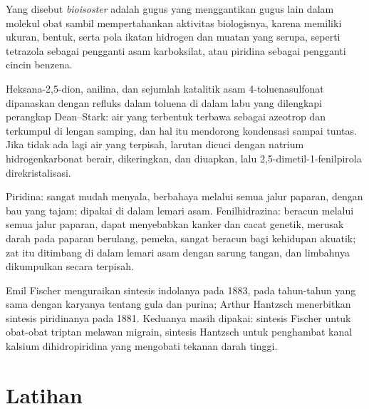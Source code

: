 \begin{definition}[Bioisoster]\label{def:b3:heterocycles:bioisostere}
Yang disebut \emph{bioisoster} adalah gugus yang menggantikan gugus lain dalam
molekul obat sambil mempertahankan aktivitas biologisnya, karena memiliki
ukuran, bentuk, serta pola ikatan hidrogen dan muatan yang serupa, seperti tetrazola sebagai
pengganti asam karboksilat, atau piridina sebagai pengganti cincin benzena.
\end{definition}

\begin{inthelab}
Heksana-2,5-dion, anilina, dan sejumlah katalitik asam 4-toluenasulfonat
dipanaskan dengan refluks dalam toluena di dalam labu yang dilengkapi perangkap Dean--Stark:
air yang terbentuk terbawa sebagai azeotrop dan terkumpul di lengan samping, dan hal itu
mendorong kondensasi sampai tuntas. Jika tidak ada lagi air yang terpisah,
larutan dicuci dengan natrium hidrogenkarbonat berair, dikeringkan, dan diuapkan,
lalu 2,5-dimetil-1-fenilpirola direkristalisasi.
\end{inthelab}

\begin{safety}{}
Piridina: sangat mudah menyala, berbahaya melalui semua jalur paparan, dengan bau yang tajam; dipakai di dalam
lemari asam. Fenilhidrazina: beracun melalui semua jalur paparan, dapat menyebabkan kanker dan cacat
genetik, merusak darah pada paparan berulang, pemeka, sangat beracun bagi
kehidupan akuatik; zat itu ditimbang di dalam lemari asam dengan sarung tangan, dan limbahnya dikumpulkan
secara terpisah.
\end{safety}

\begin{history}
Emil Fischer menguraikan sintesis indolanya pada 1883, pada tahun-tahun yang sama dengan
karyanya tentang gula dan purina; Arthur Hantzsch menerbitkan sintesis piridinanya
pada 1881. Keduanya masih dipakai: sintesis Fischer untuk obat-obat
triptan melawan migrain, sintesis Hantzsch untuk penghambat kanal kalsium
dihidropiridina yang mengobati tekanan darah tinggi.
\end{history}

\section{Latihan}

